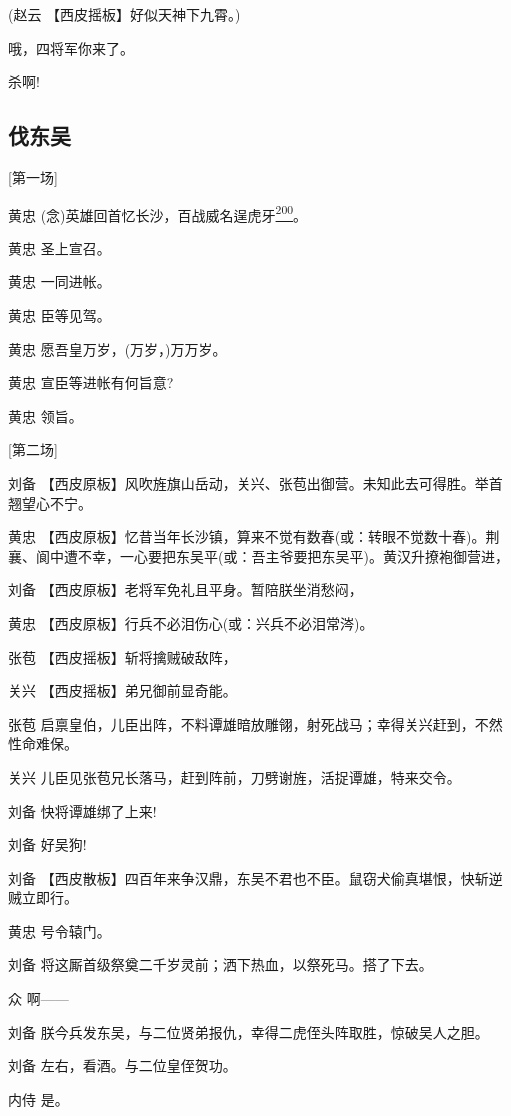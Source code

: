 (赵云 【西皮摇板】好似天神下九霄。)

哦，四将军你来了。

杀啊!

\newpage
\hypertarget{ux4f10ux4e1cux5434}{%
\subsection{伐东吴}\label{ux4f10ux4e1cux5434}}

{[}第一场{]}

黄忠
(念)英雄回首忆长沙，百战威名逞虎牙\protect\hyperlink{fn200}{\textsuperscript{200}}。

黄忠 圣上宣召。

黄忠 一同进帐。

黄忠 臣等见驾。

黄忠 愿吾皇万岁，(万岁，)万万岁。

黄忠 宣臣等进帐有何旨意?

黄忠 领旨。

{[}第二场{]}

刘备
【西皮原板】风吹旌旗山岳动，关兴、张苞出御营。未知此去可得胜。举首翘望心不宁。

黄忠
【西皮原板】忆昔当年长沙镇，算来不觉有数春(或：转眼不觉数十春)。荆襄、阆中遭不幸，一心要把东吴平(或：吾主爷要把东吴平)。黄汉升撩袍御营进，

刘备 【西皮原板】老将军免礼且平身。暂陪朕坐消愁闷，

黄忠 【西皮原板】行兵不必泪伤心(或：兴兵不必泪常涔)。

张苞 【西皮摇板】斩将擒贼破敌阵，

关兴 【西皮摇板】弟兄御前显奇能。

张苞
启禀皇伯，儿臣出阵，不料谭雄暗放雕翎，射死战马；幸得关兴赶到，不然性命难保。

关兴 儿臣见张苞兄长落马，赶到阵前，刀劈谢旌，活捉谭雄，特来交令。

刘备 快将谭雄绑了上来!

刘备 好吴狗!

刘备
【西皮散板】四百年来争汉鼎，东吴不君也不臣。鼠窃犬偷真堪恨，快斩逆贼立即行。

黄忠 号令辕门。

刘备 将这厮首级祭奠二千岁灵前；洒下热血，以祭死马。搭了下去。

众 啊------

刘备 朕今兵发东吴，与二位贤弟报仇，幸得二虎侄头阵取胜，惊破吴人之胆。

刘备 左右，看酒。与二位皇侄贺功。

内侍 是。

